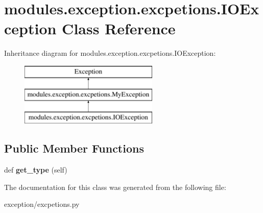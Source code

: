 \hypertarget{classmodules_1_1exception_1_1excpetions_1_1_i_o_exception}{}\section{modules.\+exception.\+excpetions.\+I\+O\+Exception Class Reference}
\label{classmodules_1_1exception_1_1excpetions_1_1_i_o_exception}
Inheritance diagram for modules.\+exception.\+excpetions.\+I\+O\+Exception\+:\begin{figure}[H]
\begin{center}
\leavevmode
\includegraphics[height=3.000000cm]{classmodules_1_1exception_1_1excpetions_1_1_i_o_exception}
\end{center}
\end{figure}
\subsection*{Public Member Functions}
\begin{DoxyCompactItemize}
\item 
\mbox{\label{classmodules_1_1exception_1_1excpetions_1_1_i_o_exception_a770b368ab4b21d16daff778631816de2}} 
def {\bfseries get\+\_\+type} (self)
\end{DoxyCompactItemize}


The documentation for this class was generated from the following file\+:\begin{DoxyCompactItemize}
\item 
exception/excpetions.\+py\end{DoxyCompactItemize}
